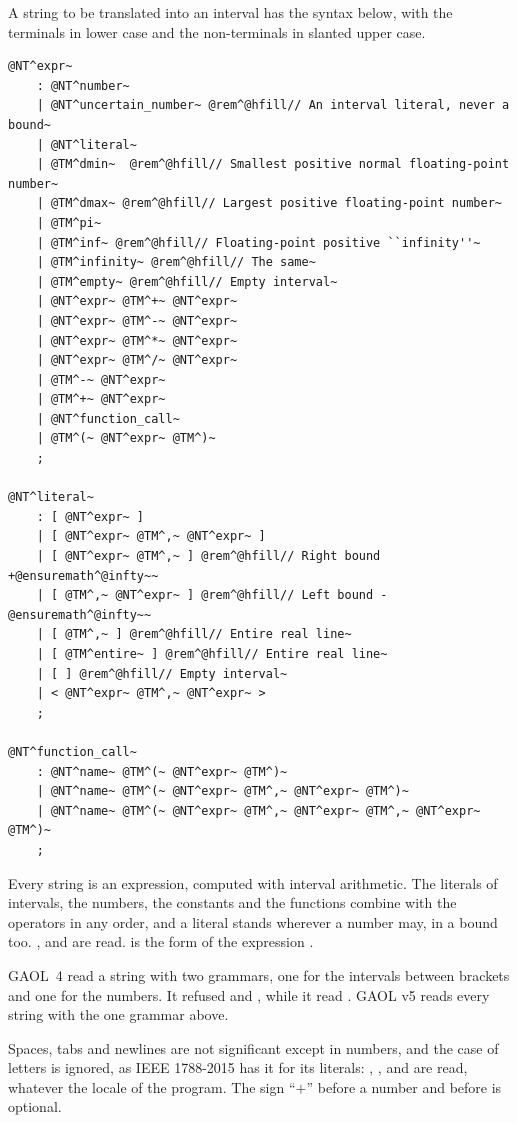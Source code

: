 \documentclass[12pt,a4paper,twoside,openright]{book}
\begin{document}
A string to be translated into an interval has the syntax below, with the
terminals in lower case and the non-terminals in slanted upper case.
%

\begin{Verbatim}[commandchars=\@\^\~,fontsize=\small]
@NT^expr~
	: @NT^number~
	| @NT^uncertain_number~ @rem^@hfill// An interval literal, never a bound~
	| @NT^literal~
	| @TM^dmin~  @rem^@hfill// Smallest positive normal floating-point number~
	| @TM^dmax~ @rem^@hfill// Largest positive floating-point number~
	| @TM^pi~
	| @TM^inf~ @rem^@hfill// Floating-point positive ``infinity''~
	| @TM^infinity~ @rem^@hfill// The same~
	| @TM^empty~ @rem^@hfill// Empty interval~
	| @NT^expr~ @TM^+~ @NT^expr~
	| @NT^expr~ @TM^-~ @NT^expr~
	| @NT^expr~ @TM^*~ @NT^expr~
	| @NT^expr~ @TM^/~ @NT^expr~
	| @TM^-~ @NT^expr~
	| @TM^+~ @NT^expr~
	| @NT^function_call~
	| @TM^(~ @NT^expr~ @TM^)~
	;

@NT^literal~
	: [ @NT^expr~ ]
	| [ @NT^expr~ @TM^,~ @NT^expr~ ]
	| [ @NT^expr~ @TM^,~ ] @rem^@hfill// Right bound +@ensuremath^@infty~~
	| [ @TM^,~ @NT^expr~ ] @rem^@hfill// Left bound -@ensuremath^@infty~~
	| [ @TM^,~ ] @rem^@hfill// Entire real line~
	| [ @TM^entire~ ] @rem^@hfill// Entire real line~
	| [ ] @rem^@hfill// Empty interval~
	| < @NT^expr~ @TM^,~ @NT^expr~ >
	;

@NT^function_call~
	: @NT^name~ @TM^(~ @NT^expr~ @TM^)~
	| @NT^name~ @TM^(~ @NT^expr~ @TM^,~ @NT^expr~ @TM^)~
	| @NT^name~ @TM^(~ @NT^expr~ @TM^,~ @NT^expr~ @TM^,~ @NT^expr~ @TM^)~
	;
\end{Verbatim}

\noindent
Every string is an expression, computed with interval arithmetic. The
literals of intervals, the numbers, the constants and the functions combine
with the operators in any order, and a literal stands wherever a number may,
in a bound too.\newinvfive{} ,  and
\code{[cos([0,1]), 2]} are read. \code{[empty]} is the form
\code{[\NT{expr}]} of the expression .

\begin{Rem}
GAOL~4 read a string with two grammars, one for the intervals between
brackets and one for the numbers. It refused  and
, while it read . GAOL v5 reads every
string with the one grammar above.\newinvfive
\end{Rem}

Spaces, tabs and newlines are not significant except in numbers, and the
case of letters is ignored, as IEEE 1788-2015 has it for its literals:
\code{[Empty]}, \code{[1, Inf]},  and  are read,
whatever the locale of the program.\newinvfive{} The sign ``$+$'' before a
number and before  is optional.
\end{document}
